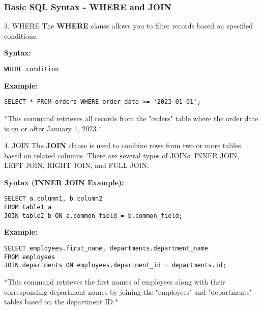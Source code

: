 \documentclass{beamer}
\begin{document}
\begin{frame}[fragile]
    \frametitle{Basic SQL Syntax - WHERE and JOIN}
    \begin{block}{3. WHERE}
        The \textbf{WHERE} clause allows you to filter records based on specified conditions.

        \textbf{Syntax:}
        \begin{lstlisting}
WHERE condition
        \end{lstlisting}

        \textbf{Example:}
        \begin{lstlisting}
SELECT * FROM orders WHERE order_date >= '2023-01-01';
        \end{lstlisting}
        *This command retrieves all records from the "orders" table where the order date is on or after January 1, 2023.*
    \end{block}
    
    \begin{block}{4. JOIN}
        The \textbf{JOIN} clause is used to combine rows from two or more tables based on related columns. There are several types of JOINs: INNER JOIN, LEFT JOIN, RIGHT JOIN, and FULL JOIN.

        \textbf{Syntax (INNER JOIN Example):}
        \begin{lstlisting}
SELECT a.column1, b.column2
FROM table1 a
JOIN table2 b ON a.common_field = b.common_field;
        \end{lstlisting}

        \textbf{Example:}
        \begin{lstlisting}
SELECT employees.first_name, departments.department_name 
FROM employees 
JOIN departments ON employees.department_id = departments.id;
        \end{lstlisting}
        *This command retrieves the first names of employees along with their corresponding department names by joining the "employees" and "departments" tables based on the department ID.*
    \end{block}
\end{frame}
\end{document}
